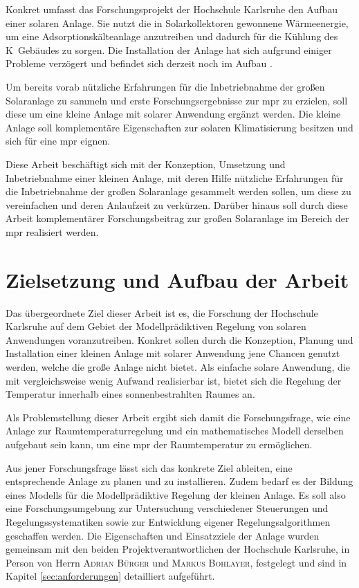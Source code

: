 Konkret umfasst das Forschungsprojekt der Hochschule Karlsruhe den Aufbau einer solaren Anlage. Sie nutzt die in Solarkollektoren gewonnene Wärmeenergie, um eine Adsorptionskälteanlage anzutreiben und dadurch für die Kühlung des K~Gebäudes zu sorgen. Die Installation der Anlage hat sich aufgrund einiger Probleme verzögert und befindet sich derzeit noch im Aufbau \cite{hska}.

Um bereits vorab nützliche Erfahrungen für die Inbetriebnahme der großen Solaranlage zu sammeln und erste Forschungsergebnisse zur \acrlong{mpr} zu erzielen, soll diese um eine kleine Anlage mit solarer Anwendung ergänzt werden. Die kleine Anlage soll komplementäre Eigenschaften zur solaren Klimatisierung besitzen und sich für eine \acrlong{mpr} eignen.

Diese Arbeit beschäftigt sich mit der Konzeption, Umsetzung und Inbetriebnahme einer kleinen Anlage, mit deren Hilfe nützliche Erfahrungen für die Inbetriebnahme der großen Solaranlage gesammelt werden sollen, um diese zu vereinfachen und deren Anlaufzeit zu verkürzen. Darüber hinaus soll durch diese Arbeit komplementärer Forschungsbeitrag zur großen Solaranlage im Bereich der \acrlong{mpr} realisiert werden.

\section{Zielsetzung und Aufbau der Arbeit}
\label{sec:ziel}

Das übergeordnete Ziel dieser Arbeit ist es, die Forschung der Hochschule Karlsruhe auf dem Gebiet der Modellprädiktiven Regelung von solaren Anwendungen voranzutreiben.
Konkret sollen durch die Konzeption, Planung und Installation einer kleinen Anlage mit solarer Anwendung jene Chancen genutzt werden, welche die große Anlage nicht bietet.
Als einfache solare Anwendung, die mit vergleichsweise wenig Aufwand realisierbar ist, bietet sich die Regelung der Temperatur innerhalb eines sonnenbestrahlten Raumes an.

Als Problemstellung dieser Arbeit ergibt sich damit die Forschungsfrage, wie eine Anlage zur Raumtemperaturregelung und ein mathematisches Modell derselben aufgebaut sein kann, um eine \acrlong{mpr} der Raumtemperatur zu ermöglichen.

Aus jener Forschungsfrage lässt sich das konkrete Ziel ableiten, eine entsprechende Anlage zu planen und zu installieren. 
Zudem bedarf es der Bildung eines Modells für die Modellprädiktive Regelung der kleinen Anlage.
Es soll also eine Forschungsumgebung zur Untersuchung verschiedener Steuerungen und Regelungssystematiken sowie zur Entwicklung eigener Regelungsalgorithmen geschaffen werden.
Die Eigenschaften und Einsatzziele der Anlage wurden gemeinsam mit den beiden Projektverantwortlichen der Hochschule Karlsruhe, in Person von Herrn \textsc{Adrian Bürger} und \textsc{Markus Bohlayer}, festgelegt und sind in Kapitel \ref{sec:anforderungen} detailliert aufgeführt.


